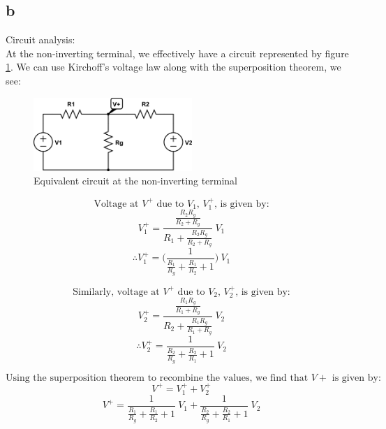 \documentclass{article}
\theoremstyle{plain}
\theoremstyle{definition}
\theoremstyle{remark}
\begin{document}
\subsection*{b}
Circuit analysis:\\

At the non-inverting terminal, we effectively have a circuit represented by figure \ref{q2_b1}. We can use Kirchoff's voltage law along with the superposition theorem, we see:
\begin{figure}[h]
\begin{center}
\includegraphics[width=6cm]{lab1_q2_kvl1.png}
\end{center}
\caption{Equivalent circuit at the non-inverting terminal}
\label{q2_b1}
\end{figure}

$$\text{Voltage at $V^+$ due to $V_1$, $V^+_1$, is given by:}$$
$$V^+_1 = \frac{\frac{R_2 R_g}{R_2+R_g}}{R_1 + \frac{R_2 R_g}{R_2+R_g}}\ V_1$$
$$\therefore V^+_1 = \Big(\frac{1}{\frac{R_1}{R_g} + \frac{R_1}{R_2} + 1}\Big) \ V_1$$

$$\text{Similarly, voltage at $V^+$ due to $V_2$, $V^+_2$, is given by:}$$
$$V^+_2 = \frac{\frac{R_1 R_g}{R_1+R_g}}{R_2 + \frac{R_1 R_g}{R_1+R_g}}\ V_2$$
$$\therefore  V^+_2 = \frac{1}{\frac{R_2}{R_g} + \frac{R_2}{R_1} + 1} \ V_2$$

$$\text{Using the superposition theorem to recombine the values, we find that $V+$ is given by:}$$
$$V^+ = V^+_1 + V^+_2 $$
$$V^+ = \frac{1}{\frac{R_1}{R_g} + \frac{R_1}{R_2} + 1} \ V_1 + \frac{1}{\frac{R_2}{R_g} + \frac{R_2}{R_1} + 1} \ V_2 $$
\end{document}
